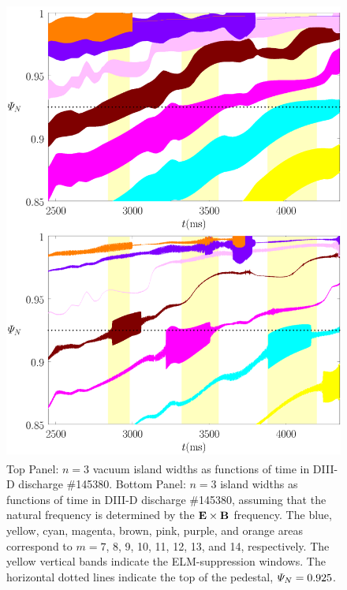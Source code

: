 \documentclass[12pt,prb,aps]{revtex4-1}
\begin{document}
\begin{figure}
\includegraphics[height=6in]{fig9.pdf}
\caption{Top Panel: $n=3$ vacuum island widths as functions of time
in   DIII-D discharge \#145380.
Bottom Panel:  $n=3$ island widths as functions of time
in   DIII-D discharge \#145380, assuming that the natural frequency is  determined by the ${\bf E}\times {\bf B}$
frequency. The blue, yellow, cyan, magenta, brown, pink,
purple, and orange  areas correspond to $m=7$, 8, 9, 10, 11, 12, 13, and 14, respectively. The yellow vertical bands indicate the ELM-suppression windows. 
The horizontal dotted lines indicate the top of the pedestal, ${\mit\Psi}_N=0.925$.} \label{fig9}
\end{figure}
\end{document}
